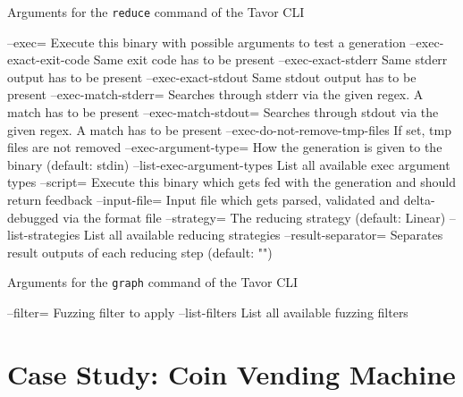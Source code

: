 \begin{landscape}
\begin{listing}
\caption{Arguments for the \texttt{reduce} command of the Tavor CLI}
\label{lst:tavor-cli-reduce-options}
\begin{textcode}
      --exec=                           Execute this binary with possible arguments to test a generation
      --exec-exact-exit-code            Same exit code has to be present
      --exec-exact-stderr               Same stderr output has to be present
      --exec-exact-stdout               Same stdout output has to be present
      --exec-match-stderr=              Searches through stderr via the given regex. A match has to be present
      --exec-match-stdout=              Searches through stdout via the given regex. A match has to be present
      --exec-do-not-remove-tmp-files    If set, tmp files are not removed
      --exec-argument-type=             How the generation is given to the binary (default: stdin)
      --list-exec-argument-types        List all available exec argument types
      --script=                         Execute this binary which gets fed with the generation and should return feedback
      --input-file=                     Input file which gets parsed, validated and delta-debugged via the format file
      --strategy=                       The reducing strategy (default: Linear)
      --list-strategies                 List all available reducing strategies
      --result-separator=               Separates result outputs of each reducing step (default: "\n")

\end{textcode}
\end{listing}
\end{landscape}

\begin{listing}
\caption{Arguments for the \texttt{graph} command of the Tavor CLI}
\label{lst:tavor-cli-graph-arguments}
\begin{textcode}
      --filter=         Fuzzing filter to apply
      --list-filters    List all available fuzzing filters
\end{textcode}
\end{listing}

\chapter{Case Study: Coin Vending Machine}
\label{chapter:coinVendingMachine}

